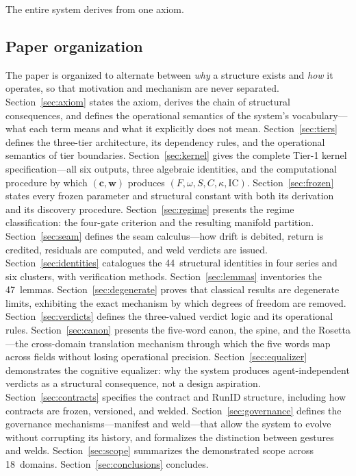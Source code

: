\documentclass[
  aps,
  prd,
  twocolumn,
  superscriptaddress,
  nofootinbib,
  floatfix
]{revtex4-2}
\newcommand{\tvec}{\mathbf{c}}
\newcommand{\wvec}{\mathbf{w}}
\newcommand{\IC}{\mathrm{IC}}
\newcommand{\RunID}{\mathrm{RunID}}
\begin{document}
The entire system derives from one axiom.

\subsection{Paper organization}

The paper is organized to alternate between \emph{why} a structure
exists and \emph{how} it operates, so that motivation and
mechanism are never separated.
Section~\ref{sec:axiom} states the axiom, derives the chain
of structural consequences, and defines the operational
semantics of the system's vocabulary---what each term means
and what it explicitly does not mean.
Section~\ref{sec:tiers} defines the three-tier architecture,
its dependency rules, and the operational semantics of tier
boundaries.
Section~\ref{sec:kernel} gives the complete Tier-1 kernel
specification---all six outputs, three algebraic identities,
and the computational procedure by which $(\tvec, \wvec)$
produces $(F, \omega, S, C, \kappa, \IC)$.
Section~\ref{sec:frozen} states every frozen parameter and
structural constant with both its derivation and its discovery
procedure.
Section~\ref{sec:regime} presents the regime classification:
the four-gate criterion and the resulting manifold partition.
Section~\ref{sec:seam} defines the seam calculus---how drift
is debited, return is credited, residuals are computed, and
weld verdicts are issued.
Section~\ref{sec:identities} catalogues the 44~structural
identities in four series and six clusters, with verification
methods.
Section~\ref{sec:lemmas} inventories the 47~lemmas.
Section~\ref{sec:degenerate} proves that classical results
are degenerate limits, exhibiting the exact mechanism by
which degrees of freedom are removed.
Section~\ref{sec:verdicts} defines the three-valued verdict
logic and its operational rules.
Section~\ref{sec:canon} presents the five-word canon, the
spine, and the Rosetta---the cross-domain translation mechanism
through which the five words map across fields without losing
operational precision.
Section~\ref{sec:equalizer} demonstrates the cognitive
equalizer: why the system produces agent-independent verdicts
as a structural consequence, not a design aspiration.
Section~\ref{sec:contracts} specifies the contract and $\RunID$
structure, including how contracts are frozen, versioned, and
welded.
Section~\ref{sec:governance} defines the governance
mechanisms---manifest and weld---that allow the system to evolve
without corrupting its history, and formalizes the distinction
between gestures and welds.
Section~\ref{sec:scope} summarizes the demonstrated scope
across 18~domains.
Section~\ref{sec:conclusions} concludes.
\end{document}
